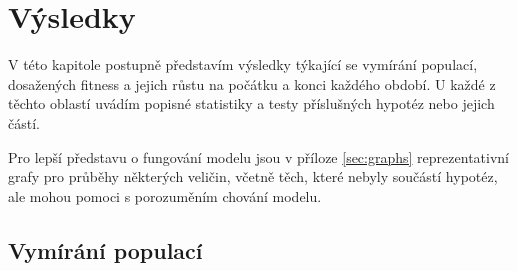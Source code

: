 \chapter{Výsledky}

%
%
%
%
%
%
%

V této kapitole postupně představím výsledky týkající se vymírání populací, dosažených fitness a jejich růstu
na počátku a konci každého období. U každé z těchto oblastí uvádím popisné statistiky a testy příslušných
hypotéz nebo jejich částí.

Pro lepší představu o fungování modelu jsou v příloze \ref{sec:graphs} reprezentativní grafy pro průběhy některých
veličin, včetně těch, které nebyly součástí hypotéz, ale mohou pomoci s porozuměním chování modelu.

\section{Vymírání populací}

